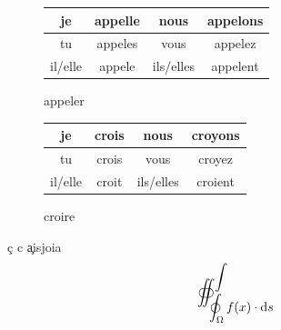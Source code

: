 \documentclass{article}[20pt]{}
\begin{document}
\begin{multicols}{2}
\begin{figure}[ht]
	\centering
	\begin{tabular}{|cc|cc|}\hline
		je & appelle &nous & appelons \\ \hline
		tu & appeles &vous &appelez \\ \hline
		il/elle & appele &ils/elles & appelent	\\ \hline			
	\end{tabular}
	\caption{appeler}	
\end{figure}	
\begin{figure}[ht]
	\begin{tabular}{|cc|cc|}\hline
		je & crois & nous & croyons \\ \hline
		tu & crois & vous & croyez \\ \hline 
		il/elle & croit	&ils/elles & croient \\ \hline
	\end{tabular}
	\caption{croire}
\end{figure}
\end{multicols}
\c c c {\c aisjoia}
\[\oiint_{\displaystyle\oint_{\Omega}f(x)\cdot \mathrm{d} s}^{\displaystyle \int}\]
\end{document}

